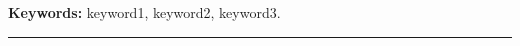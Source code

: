 \documentclass[12pt,twoside,a4paper]{book}
\makeatletter
\renewcommand{\chaptermark}[1]{\markboth{#1}{}}
\def\thickhrulefill{\leavevmode \leaders \hrule height .1ex \hfill \kern \z@}
\makeatother
\begin{document}
\noindent \textbf{Keywords:} keyword1, keyword2, keyword3.

\vspace*{1cm}%
\thickhrulefill

\newpage
\tableofcontents    %

%
%

\listoffigures

\listoftables

\mainmatter


\onehalfspacing            %












\appendix
\end{document}
